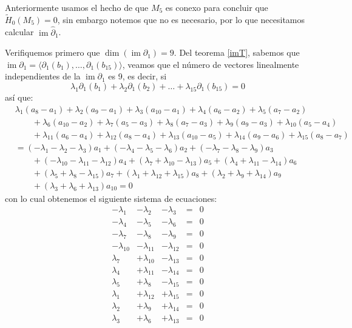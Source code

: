 \documentclass[12pt]{book}
\theoremstyle{definition}
\DeclareMathOperator{\im}{im}
\newcounter{in}
\begin{document}
Anteriormente usamos el hecho de que $M_{5}$ es conexo para concluir que $\widetilde
H_{0}(M_{5})=0$, sin embargo notemos que no es necesario, por lo que
necesitamos calcular $\im \widehat\partial_{1}$. 

Verifiquemos primero que $\dim(\im \partial_{1})=9$. Del teorema
\ref{imT}, sabemos que
$\im \partial_{1}=\langle\partial_{1}(b_{1}),\ldots,\partial_{1}(b_{15})\rangle$,
veamos que el número de vectores linealmente independientes de la
$\im \partial_{1}$ es 9, es
decir, si
$$\lambda_{1}\partial_{1}(b_{1})+\lambda_{2}\partial_{1}(b_{2})+\ldots+\lambda_{15}\partial_{1}(b_{15})=0$$
así que:
\begin{align*}
  &\lambda_{1}(a_{8}-a_{1})+\lambda_{2}(a_{9}-a_{1})+\lambda_{3}(a_{10}-a_{1})+\lambda_{4}(a_{6}-a_{2})+\lambda_{5}(a_{7}-a_{2})\\
  &\qquad
  {}+\lambda_{6}(a_{10}-a_{2})+\lambda_{7}(a_{5}-a_{3})+\lambda_{8}(a_{7}-a_{3})+\lambda_{9}(a_{9}-a_{3})+\lambda_{10}(a_{5}-a_{4})\\
  &\qquad{}+\lambda_{11}(a_{6}-a_{4})+\lambda_{12}(a_{8}-a_{4})+\lambda_{13}(a_{10}-a_{5})+\lambda_{14}(a_{9}-a_{6})+\lambda_{15}(a_{8}-a_{7})\\
  &=(-\lambda_{1}-\lambda_{2}-\lambda_{3})a_{1}+(-\lambda_{4}-\lambda_{5}-\lambda_{6})a_{2}+(-\lambda_{7}-\lambda_{8}-\lambda_{9})a_{3}\\
  &\qquad{}+(-\lambda_{10}-\lambda_{11}-\lambda_{12})a_{4}+(\lambda_{7}+\lambda_{10}-\lambda_{13})a_{5}+(\lambda_{4}+\lambda_{11}-\lambda_{14})a_{6}\\
  &\qquad{}+(\lambda_{5}+\lambda_{8}-\lambda_{15})a_{7}+(\lambda_{1}+\lambda_{12}+\lambda_{15})a_{8}+(\lambda_{2}+\lambda_{9}+\lambda_{14})a_{9}\\
  &\qquad{}+(\lambda_{3}+\lambda_{6}+\lambda_{13})a_{10}=0
\end{align*}
con lo cual obtenemos el siguiente sistema de ecuaciones:
 \[\begin{array}{rrrrr}
   -\lambda_{1} & -\lambda_{2} & -\lambda_{3} & = & 0 \\
   -\lambda_{4} & -\lambda_{5} & -\lambda_{6} & = & 0 \\
   -\lambda_{7} & -\lambda_{8} & -\lambda_{9} & = & 0 \\
   -\lambda_{10} & -\lambda_{11} & -\lambda_{12} & = & 0 \\
   \lambda_{7} & +\lambda_{10} & -\lambda_{13} & = & 0 \\
   \lambda_{4} & +\lambda_{11} & -\lambda_{14} & = & 0 \\
   \lambda_{5} & +\lambda_{8} & -\lambda_{15} & = & 0 \\
   \lambda_{1} & +\lambda_{12} & +\lambda_{15} & = & 0 \\
   \lambda_{2} & +\lambda_{9} & +\lambda_{14} & = & 0 \\
   \lambda_{3} & +\lambda_{6} & +\lambda_{13} & = & 0 
 \end{array}\]
\end{document}
